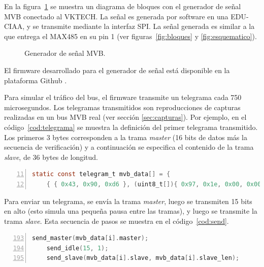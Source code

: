 En la figura~\ref{fig:generador} se muestra un diagrama de bloques con el generador de señal MVB conectado al VKTECH. La señal es generada por software en una EDU-CIAA, y se transmite mediante la interfaz SPI. La señal generada es similar a la que entrega el MAX485 en su pin 1 (ver figuras~\ref{fig:bloques} y \ref{fig:esquematico}).

\begin{figure}[htbp]
	\centering
    {
        \fontsize{8pt}{8pt}\selectfont
        
    }
	\caption{Generador de señal MVB.}
    \label{fig:generador}
\end{figure}

El firmware desarrollado para el generador de señal está disponible en la plataforma Github \cite{mvbgen}.

Para simular el tráfico del bus, el firmware transmite un telegrama cada 750 microsegundos.
Los telegramas transmitidos son reproducciones de capturas realizadas en un bus MVB real (ver sección \ref{sec:capturas}). Por ejemplo, en el código~\ref{cod:telegrama} se muestra la definición del primer telegrama transmitido.
Los primeros 3 bytes corresponden a la trama \textit{master} (16 bits de datos más la secuencia de verificación) y a continuación se especifica el contenido de la trama \textit{slave}, de 36 bytes de longitud.

\begin{lstlisting}[label=cod:telegrama,caption=Definición de un telegrama a transmitir (\texttt{gen.c}).,float=htbp,numberstyle=\footnotesize\ttfamily,language=C,breaklines=true,numbers=left,firstnumber=11,xleftmargin=1cm]
static const telegram_t mvb_data[] = {
    { { 0x43, 0x90, 0xd6 }, (uint8_t[]){ 0x97, 0x1e, 0x00, 0x00, 0x00, 0x82, 0x14, 0x06, 0xdf, 0x1e, 0x0b, 0x31, 0x0f, 0x00, 0x17, 0x05, 0x8c, 0xf8, 0x00, 0x00, 0x00, 0x00, 0x00, 0x00, 0x03, 0x4d, 0xc9, 0x11, 0x94, 0x11, 0xa8, 0x11, 0xa8, 0x04, 0x05, 0x88 }, 36 },
\end{lstlisting}

Para enviar un telegrama, se envía la trama \textit{master}, luego se transmiten 15 bits en alto (esto simula una pequeña pausa entre las tramas), y luego se transmite la trama \textit{slave}. Esta secuencia de pasos se muestra en el código~\ref{cod:send}.

\begin{lstlisting}[label=cod:send,caption=Secuencia de pasos para transmitir un telegrama (\texttt{gen.c}).,float=htbp,numberstyle=\footnotesize\ttfamily,language=C,breaklines=true,numbers=left,firstnumber=193,xleftmargin=1cm]
    send_master(mvb_data[i].master);
    send_idle(15, 1);
    send_slave(mvb_data[i].slave, mvb_data[i].slave_len);
\end{lstlisting}

